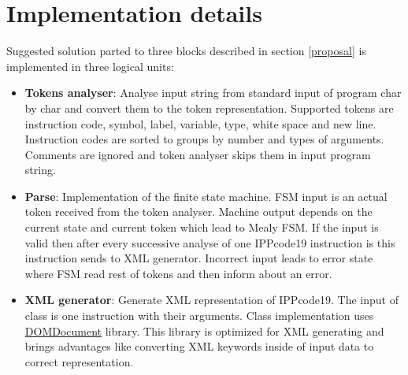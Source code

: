 \documentclass[a4paper, 10pt]{article}
\begin{document}
\section{Implementation details}
Suggested solution parted to three blocks described in section \ref{proposal} is implemented in three logical units:
\begin{itemize}
	\item \textbf{Tokens analyser}: Analyse input string from standard input of program char by char and convert them to the token representation. Supported tokens are instruction code, symbol, label, variable, type, white space and new line. Instruction codes are sorted to groups by number and types of arguments. Comments are ignored and token analyser skips them in input program string.
	\item \textbf{Parse}: Implementation of the finite state machine. FSM input is an actual token received from the token analyser. Machine output depends on the current state and current token which lead to Mealy FSM. If the input is valid then after every successive analyse of one IPPcode19 instruction is this instruction sends to XML generator. Incorrect input leads to error state where FSM read rest of tokens and then inform about an error.
	\item \textbf{XML generator}: Generate XML representation of IPPcode19. The input of class is one instruction with their arguments. Class implementation uses \href{http://php.net/manual/en/class.domdocument.php}{DOMDocument} library. This library is optimized for XML generating and brings advantages like converting XML keywords inside of input data to correct representation. 
\end{itemize}
\end{document}
